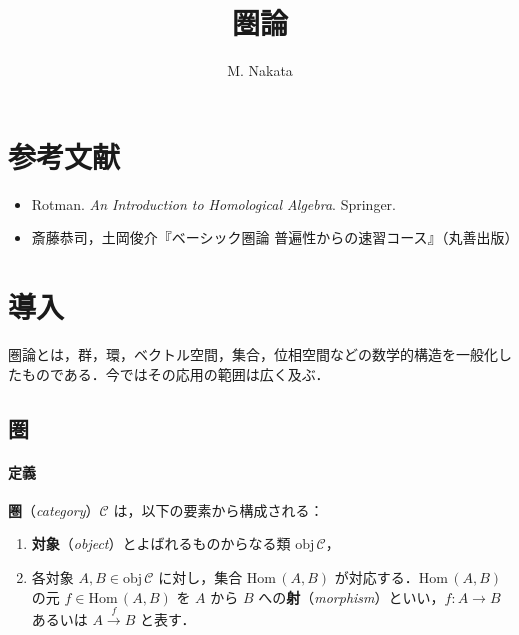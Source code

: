 \documentclass[10pt,b5paper,pandoc]{bxjsarticle}
\title{圏論}
\author{M. Nakata}
\date{}
\providecommand{\tightlist}{%
  \setlength{\itemsep}{0pt}\setlength{\parskip}{0pt}}
\let\oldparagraph\paragraph
\renewcommand{\paragraph}[1]{\oldparagraph{#1}\mbox{}}
\begin{document}
\maketitle

{
\setcounter{tocdepth}{3}
\tableofcontents
}
\hypertarget{ux53c2ux8003ux6587ux732e}{%
\section{参考文献}\label{ux53c2ux8003ux6587ux732e}}

\begin{itemize}
\tightlist
\item
  Rotman. \emph{An Introduction to Homological Algebra}. Springer.
\item
  斎藤恭司，土岡俊介『ベーシック圏論
  普遍性からの速習コース』（丸善出版）
\end{itemize}

\hypertarget{topology-introduction}{%
\section{導入}\label{topology-introduction}}

圏論とは，群，環，ベクトル空間，集合，位相空間などの数学的構造を一般化したものである．今ではその応用の範囲は広く及ぶ．

\hypertarget{ux570f}{%
\subsection{圏}\label{ux570f}}

\hypertarget{ux5b9aux7fa9}{%
\paragraph{定義}\label{ux5b9aux7fa9}}

\textbf{圏}（\emph{category}）\(\mathscr C\)
は，以下の要素から構成される：

\begin{enumerate}
\def\labelenumi{\roman{enumi})}
\tightlist
\item
  \textbf{対象}（\emph{object}）とよばれるものからなる類
  \(\mathrm{obj}\,\mathscr C\)，
\item
  各対象 \(A, B \in \mathrm{obj}\,\mathscr C\) に対し，集合
  \(\mathrm{Hom}\,(A, B)\) が対応する．\(\mathrm{Hom}\,(A,B)\) の元
  \(f \in \mathrm{Hom}\,(A,B)\) を \(A\) から \(B\)
  への\textbf{射}（\emph{morphism}）といい，\(f \colon A \to B\)
  あるいは \(A \xrightarrow{f} B\) と表す．
\end{enumerate}
\end{document}
